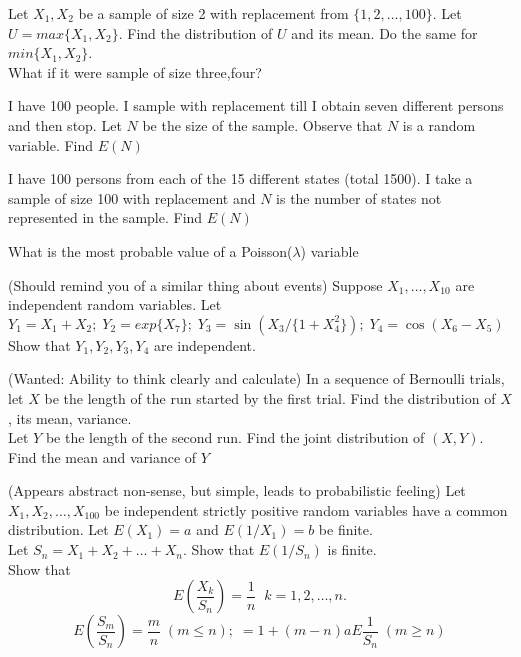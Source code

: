 \documentclass[12pt]{article}
\newenvironment{question}[2][Question]{\begin{trivlist}
\item[\hskip \labelsep {\bfseries #1}\hskip \labelsep {\bfseries #2.}]}{\end{trivlist}}
\begin{document}
\begin{question}{41}
Let $X_1,X_2$ be a sample of size 2 with replacement from $\{1,2,\ldots,100\}$. Let $U = max\{X_1,X_2\}$. Find the distribution of $U$ and its mean. Do the same for $min\{X_1,X_2\}$.\\What if it were sample of size three,four?
\end{question}

\begin{question}{42}
I have 100 people. I sample with replacement till I obtain seven different persons and then stop. Let $N$ be the size of the sample. Observe that $N$ is a random variable. Find $E(N)$
\end{question}

\begin{question}{43}
I have 100 persons from each of the 15 different states (total 1500). I take a sample of size 100 with replacement and $N$ is the number of states not represented in the sample. Find $E(N)$
\end{question}

\begin{question}{44}
What is the most probable value of a Poisson($\lambda$) variable
\end{question}

\begin{question}{45}
(Should remind you of a similar thing about events) Suppose $X_1,\ldots,X_{10}$ are independent random variables. Let $Y_1=X_1+X_2;\; Y_2=exp\{X_7\};\; Y_3 = \sin(X_3/\{1 + X_4^2\});\; Y_4 = \cos(X_6-X_5)$\\ Show that $Y_1,Y_2,Y_3,Y_4$ are independent.
\end{question}

\begin{question}{46}
(Wanted: Ability to think clearly and calculate) In a sequence of Bernoulli trials, let $X$ be the length of the run started by the first trial. Find the distribution of $X$, its mean, variance.\\
Let $Y$ be the length of the second run. Find the joint distribution of $(X,Y)$. Find the mean and variance of $Y$
\end{question}

\begin{question}{47}
(Appears abstract non-sense, but simple, leads to probabilistic feeling) Let $X_1,X_2,\ldots,X_100$ be independent strictly positive random variables have a common distribution. Let $E(X_1) = a$ 	and $E(1/X_1) = b$ be finite.\\
Let $S_n = X_1 + X_2 + \ldots + X_n$. Show that $E(1/S_n)$ is finite.\\
Show that
\[
E(\frac{X_k}{S_n}) = \frac{1}{n}\;\; k = 1,2,\ldots,n.
\]
\[
E(\frac{S_m}{S_n}) = \frac{m}{n}\; (m \leq n);\; = 1 + (m-n)aE\frac{1}{S_n}\; (m \geq n)
\]
\end{question}
\end{document}
